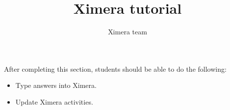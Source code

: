 \documentclass{ximera}
\title{Ximera tutorial}
\author{Ximera team}
\begin{document}
\begin{abstract}
\end{abstract}

\maketitle

\begin{sectionOutcomes}

After completing this section, students should be able to do the following: 

\begin{itemize}
\item Type answers into Ximera.
\item Update Ximera activities.
\end{itemize}

\end{sectionOutcomes}
\end{document}
